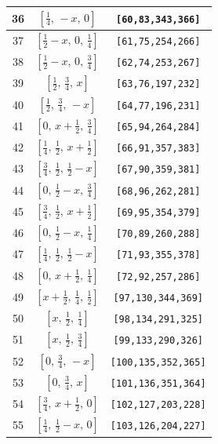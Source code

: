 \documentclass[fleqn,8pt]{jsarticle}
\begin{document}
\begin{longtable}{ccc}
36 & $\left[ \frac{1}{4},\, - x,\, 0 \right]$ & {\tt [60,83,343,366]} \\ \hline
37 & $\left[ \frac{1}{2} - x,\, 0,\, \frac{1}{4} \right]$ & {\tt [61,75,254,266]} \\ \hline
38 & $\left[ \frac{1}{2} - x,\, 0,\, \frac{3}{4} \right]$ & {\tt [62,74,253,267]} \\ \hline
39 & $\left[ \frac{1}{2},\, \frac{3}{4},\, x \right]$ & {\tt [63,76,197,232]} \\ \hline
40 & $\left[ \frac{1}{2},\, \frac{3}{4},\, - x \right]$ & {\tt [64,77,196,231]} \\ \hline
41 & $\left[ 0,\, x + \frac{1}{2},\, \frac{3}{4} \right]$ & {\tt [65,94,264,284]} \\ \hline
42 & $\left[ \frac{1}{4},\, \frac{1}{2},\, x + \frac{1}{2} \right]$ & {\tt [66,91,357,383]} \\ \hline
43 & $\left[ \frac{3}{4},\, \frac{1}{2},\, \frac{1}{2} - x \right]$ & {\tt [67,90,359,381]} \\ \hline
44 & $\left[ 0,\, \frac{1}{2} - x,\, \frac{3}{4} \right]$ & {\tt [68,96,262,281]} \\ \hline
45 & $\left[ \frac{3}{4},\, \frac{1}{2},\, x + \frac{1}{2} \right]$ & {\tt [69,95,354,379]} \\ \hline
46 & $\left[ 0,\, \frac{1}{2} - x,\, \frac{1}{4} \right]$ & {\tt [70,89,260,288]} \\ \hline
47 & $\left[ \frac{1}{4},\, \frac{1}{2},\, \frac{1}{2} - x \right]$ & {\tt [71,93,355,378]} \\ \hline
48 & $\left[ 0,\, x + \frac{1}{2},\, \frac{1}{4} \right]$ & {\tt [72,92,257,286]} \\ \hline
49 & $\left[ x + \frac{1}{2},\, \frac{1}{4},\, \frac{1}{2} \right]$ & {\tt [97,130,344,369]} \\ \hline
50 & $\left[ x,\, \frac{1}{2},\, \frac{1}{4} \right]$ & {\tt [98,134,291,325]} \\ \hline
51 & $\left[ x,\, \frac{1}{2},\, \frac{3}{4} \right]$ & {\tt [99,133,290,326]} \\ \hline
52 & $\left[ 0,\, \frac{3}{4},\, - x \right]$ & {\tt [100,135,352,365]} \\ \hline
53 & $\left[ 0,\, \frac{3}{4},\, x \right]$ & {\tt [101,136,351,364]} \\ \hline
54 & $\left[ \frac{3}{4},\, x + \frac{1}{2},\, 0 \right]$ & {\tt [102,127,203,228]} \\ \hline
55 & $\left[ \frac{1}{4},\, \frac{1}{2} - x,\, 0 \right]$ & {\tt [103,126,204,227]} \\ \hline

\end{longtable}
\end{document}
